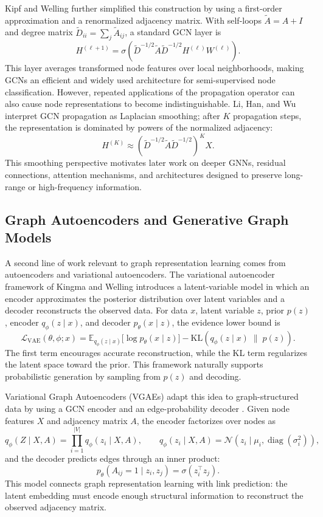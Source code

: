 \documentclass[11pt]{article}
\begin{document}
Kipf and Welling \cite{kipf2017semi} further simplified this construction by using a first-order approximation and a renormalized adjacency matrix. With self-loops $\widetilde{A}=A+I$ and degree matrix $\widetilde{D}_{ii}=\sum_j \widetilde{A}_{ij}$, a standard GCN layer is
\[
    H^{(\ell+1)}
    = \sigma\!\left(
        \widetilde{D}^{-1/2}\widetilde{A}\widetilde{D}^{-1/2}
        H^{(\ell)}W^{(\ell)}
      \right).
\]
This layer averages transformed node features over local neighborhoods, making GCNs an efficient and widely used architecture for semi-supervised node classification. However, repeated applications of the propagation operator can also cause node representations to become indistinguishable. Li, Han, and Wu \cite{li2018deeper} interpret GCN propagation as Laplacian smoothing; after $K$ propagation steps, the representation is dominated by powers of the normalized adjacency:
\[
    H^{(K)} \approx
    \left(\widetilde{D}^{-1/2}\widetilde{A}\widetilde{D}^{-1/2}\right)^K X.
\]
This smoothing perspective motivates later work on deeper GNNs, residual connections, attention mechanisms, and architectures designed to preserve long-range or high-frequency information.

\subsection{Graph Autoencoders and Generative Graph Models}
A second line of work relevant to graph representation learning comes from autoencoders and variational autoencoders. The variational autoencoder framework of Kingma and Welling \cite{kingma2014autoencoding} introduces a latent-variable model in which an encoder approximates the posterior distribution over latent variables and a decoder reconstructs the observed data. For data $x$, latent variable $z$, prior $p(z)$, encoder $q_\phi(z\mid x)$, and decoder $p_\theta(x\mid z)$, the evidence lower bound is
\[
    \mathcal{L}_{\mathrm{VAE}}(\theta,\phi;x)
    = \mathbb{E}_{q_\phi(z\mid x)}\big[\log p_\theta(x\mid z)\big]
      - \mathrm{KL}\!\left(q_\phi(z\mid x)\;\|\;p(z)\right).
\]
The first term encourages accurate reconstruction, while the KL term regularizes the latent space toward the prior. This framework naturally supports probabilistic generation by sampling from $p(z)$ and decoding.

Variational Graph Autoencoders (VGAEs) adapt this idea to graph-structured data by using a GCN encoder and an edge-probability decoder \cite{kipf2016variational}. Given node features $X$ and adjacency matrix $A$, the encoder factorizes over nodes as
\[
    q_\phi(Z\mid X,A)
    = \prod_{i=1}^{|V|} q_\phi(z_i\mid X,A),
    \qquad
    q_\phi(z_i\mid X,A)
    = \mathcal{N}\!\left(z_i\mid \mu_i,\operatorname{diag}(\sigma_i^2)\right),
\]
and the decoder predicts edges through an inner product:
\[
    p_\theta(A_{ij}=1\mid z_i,z_j)
    = \sigma(z_i^\top z_j).
\]
This model connects graph representation learning with link prediction: the latent embedding must encode enough structural information to reconstruct the observed adjacency matrix.
\end{document}
